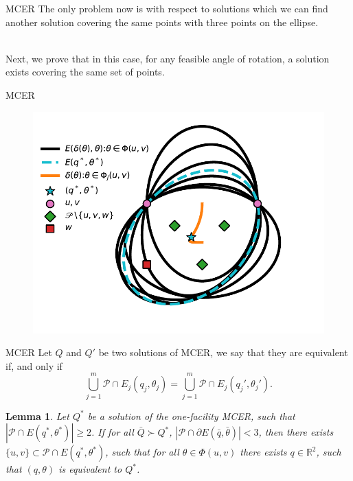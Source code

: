 \documentclass{beamer}
\newcommand{\R}{\mathbb{R}}
\newcommand{\Pp}{\mathscr{P}}
\newtheorem{lem}{Lemma}
\theoremstyle{definition}
\begin{document}
\begin{frame}{MCER}
	The only problem now is with respect to solutions which we can find another solution covering the same points with three points on the ellipse.
	\\~\
	
	Next, we prove that in this case, for any feasible angle of rotation, a solution exists covering the same set of points.
\end{frame}

\begin{frame}{MCER}
	\begin{figure}[H]
		\centering
		\includegraphics[scale=.7]{../article/figures/lema-3-points}
		\label{fig:lema-3-points}
	\end{figure}
\end{frame}

\begin{frame}{MCER}
	Let $Q$ and $Q'$ be two solutions of MCER, we say that they are equivalent if, and only if
	\begin{equation*}
	\bigcup_{j=1}^m \Pp \cap E_j(q_j, \theta_j) = 	\bigcup_{j=1}^m \Pp \cap E_j(q_j', \theta_j').
	\end{equation*}
\begin{lem}\label{lema:3pnts}
	Let $Q^*$ be a solution of the one-facility MCER, such that $|\Pp \cap E(q^*, \theta^*)|\ge2$.
	If for all $\bar{Q} \succ Q^*$, $|\Pp \cap \partial E(\bar{q}, \bar{\theta})| < 3$, then there exists $\{u, v\} \subset \Pp \cap E(q^*, \theta^*)$, such that for all $\theta\in \Phi(u,v)$ there exists $q \in \R^2$, such that $(q, \theta)$ is equivalent to $Q^*$.
\end{lem}
\end{frame}
\end{document}
